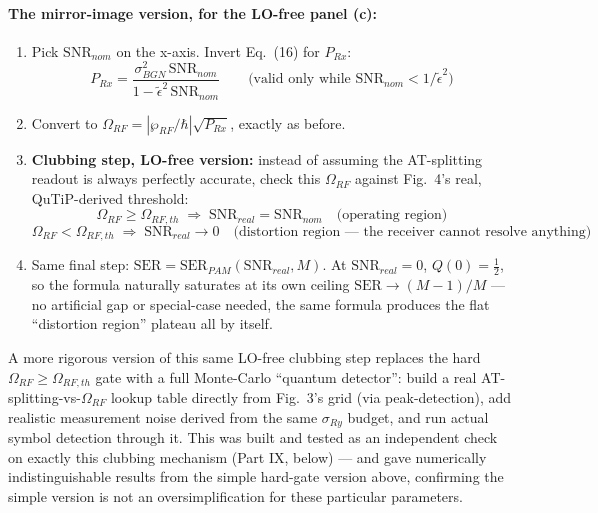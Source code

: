 \documentclass[11pt]{article}
\begin{document}
\paragraph{The mirror-image version, for the LO-free panel (c):}
\begin{enumerate}
\item Pick $\text{SNR}_{nom}$ on the x-axis. Invert Eq.~(16) for $P_{Rx}$:
\[
\boxed{P_{Rx} = \frac{\sigma_{BGN}^2\,\text{SNR}_{nom}}{1-\tilde\epsilon^2\,\text{SNR}_{nom}}}\qquad\text{(valid only while }\text{SNR}_{nom}<1/\tilde\epsilon^2\text{)}
\]
\item Convert to $\Omega_{RF}=|\wp_{RF}/\hbar|\sqrt{P_{Rx}}$, exactly as before.
\item \textbf{Clubbing step, LO-free version:} instead of assuming the AT-splitting readout is always perfectly accurate, check this $\Omega_{RF}$ against Fig.~4's real, QuTiP-derived threshold:
\[
\Omega_{RF} \ge \Omega_{RF,th}\;\Rightarrow\; \text{SNR}_{real}=\text{SNR}_{nom} \quad\text{(operating region)}
\]
\[
\Omega_{RF} < \Omega_{RF,th}\;\Rightarrow\; \text{SNR}_{real}\to 0 \quad\text{(distortion region --- the receiver cannot resolve anything)}
\]
\item Same final step: $\text{SER}=\text{SER}_{PAM}(\text{SNR}_{real},M)$. At $\text{SNR}_{real}=0$, $Q(0)=\tfrac12$, so the formula naturally saturates at its own ceiling $\text{SER}\to(M-1)/M$ --- no artificial gap or special-case needed, the same formula produces the flat ``distortion region'' plateau all by itself.
\end{enumerate}
\begin{simuse}
A more rigorous version of this same LO-free clubbing step replaces the hard $\Omega_{RF}\ge\Omega_{RF,th}$ gate with a full Monte-Carlo ``quantum detector'': build a real AT-splitting-vs-$\Omega_{RF}$ lookup table directly from Fig.~3's grid (via peak-detection), add realistic measurement noise derived from the same $\sigma_{Ry}$ budget, and run actual symbol detection through it. This was built and tested as an independent check on exactly this clubbing mechanism (Part IX, below) --- and gave numerically indistinguishable results from the simple hard-gate version above, confirming the simple version is not an oversimplification for these particular parameters.
\end{simuse}
\begin{center}
\end{center}
\end{document}
